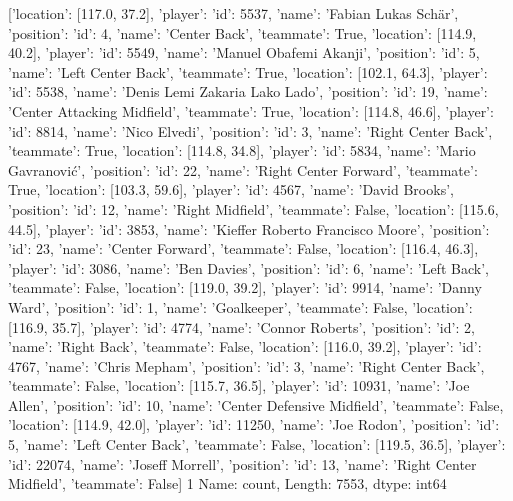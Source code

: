 [{'location': [117.0, 37.2], 'player': {'id': 5537, 'name': 'Fabian Lukas Schär'}, 'position': {'id': 4, 'name': 'Center Back'}, 'teammate': True}, {'location': [114.9, 40.2], 'player': {'id': 5549, 'name': 'Manuel Obafemi Akanji'}, 'position': {'id': 5, 'name': 'Left Center Back'}, 'teammate': True}, {'location': [102.1, 64.3], 'player': {'id': 5538, 'name': 'Denis Lemi Zakaria Lako Lado'}, 'position': {'id': 19, 'name': 'Center Attacking Midfield'}, 'teammate': True}, {'location': [114.8, 46.6], 'player': {'id': 8814, 'name': 'Nico Elvedi'}, 'position': {'id': 3, 'name': 'Right Center Back'}, 'teammate': True}, {'location': [114.8, 34.8], 'player': {'id': 5834, 'name': 'Mario Gavranović'}, 'position': {'id': 22, 'name': 'Right Center Forward'}, 'teammate': True}, {'location': [103.3, 59.6], 'player': {'id': 4567, 'name': 'David Brooks'}, 'position': {'id': 12, 'name': 'Right Midfield'}, 'teammate': False}, {'location': [115.6, 44.5], 'player': {'id': 3853, 'name': 'Kieffer Roberto Francisco Moore'}, 'position': {'id': 23, 'name': 'Center Forward'}, 'teammate': False}, {'location': [116.4, 46.3], 'player': {'id': 3086, 'name': 'Ben Davies'}, 'position': {'id': 6, 'name': 'Left Back'}, 'teammate': False}, {'location': [119.0, 39.2], 'player': {'id': 9914, 'name': 'Danny Ward'}, 'position': {'id': 1, 'name': 'Goalkeeper'}, 'teammate': False}, {'location': [116.9, 35.7], 'player': {'id': 4774, 'name': 'Connor Roberts'}, 'position': {'id': 2, 'name': 'Right Back'}, 'teammate': False}, {'location': [116.0, 39.2], 'player': {'id': 4767, 'name': 'Chris Mepham'}, 'position': {'id': 3, 'name': 'Right Center Back'}, 'teammate': False}, {'location': [115.7, 36.5], 'player': {'id': 10931, 'name': 'Joe Allen'}, 'position': {'id': 10, 'name': 'Center Defensive Midfield'}, 'teammate': False}, {'location': [114.9, 42.0], 'player': {'id': 11250, 'name': 'Joe Rodon'}, 'position': {'id': 5, 'name': 'Left Center Back'}, 'teammate': False}, {'location': [119.5, 36.5], 'player': {'id': 22074, 'name': 'Joseff Morrell'}, 'position': {'id': 13, 'name': 'Right Center Midfield'}, 'teammate': False}]                                                                                                                                                                                                                                                                                                                                                                                                                                                                                                                                                                                                                                                                                                                                                                                                                                      1
Name: count, Length: 7553, dtype: int64

